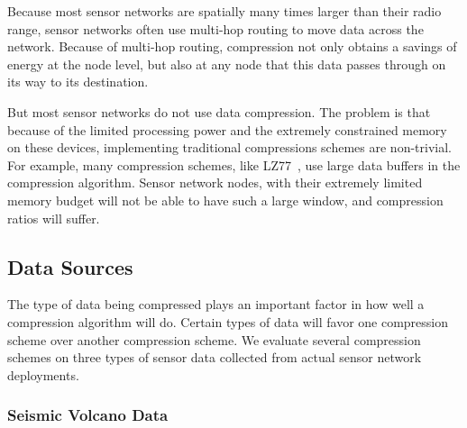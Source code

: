 Because most sensor networks are spatially many times larger than
their radio range, sensor networks often use multi-hop routing to move
data across the network.  Because of multi-hop routing, compression
not only obtains a savings of energy at the node level, but also at
any node that this data passes through on its way to its destination.

But most sensor networks do not use data compression.  The problem is
that because of the limited processing power and the extremely
constrained memory on these devices, implementing traditional
compressions schemes are non-trivial.  For example, many compression
schemes, like LZ77~\cite{lz77}, use large data buffers in the
compression algorithm.  Sensor network nodes, with their extremely
limited memory budget will not be able to have such a large window,
and compression ratios will suffer.

\subsection{Data Sources} 

The type of data being compressed plays an important factor in how
well a compression algorithm will do.  Certain types of data will
favor one compression scheme over another compression scheme.  We
evaluate several compression schemes on three types of sensor data
collected from actual sensor network deployments.  

\subsubsection{Seismic Volcano Data}

